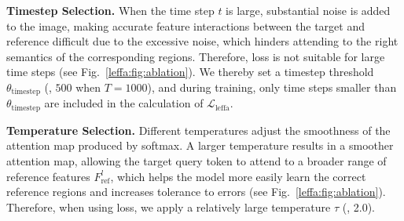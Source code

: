 \noindent \textbf{Timestep Selection.}
When the time step $t$ is large, substantial noise is added to the image, making accurate feature interactions between the target and reference difficult due to the excessive noise, which hinders attending to the right semantics of the corresponding regions.
Therefore, \leffa{} loss is not suitable for large time steps (see Fig.~\ref{leffa:fig:ablation}).
We thereby set a timestep threshold $\theta_{\text{timestep}}$ (\eg, $500$ when $T=1000$), and during training, only time steps smaller than $\theta_{\text{timestep}}$ are included in the calculation of $\mathcal{L}_{\text{leffa}}$.

\noindent \textbf{Temperature Selection.}
Different temperatures adjust the smoothness of the attention map produced by softmax.
A larger temperature results in a smoother attention map, allowing the target query token to attend to a broader range of reference features $F_{\text{ref}}^{l}$, which helps the model more easily learn the correct reference regions and increases tolerance to errors (see Fig.~\ref{leffa:fig:ablation}).
Therefore, when using \leffa{} loss, we apply a relatively large temperature $\tau$ (\ie, 2.0).
